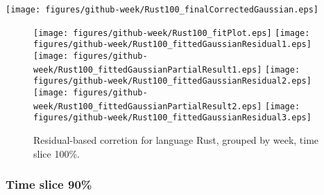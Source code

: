 \begin{center}
{\texttt{[image: figures/github-week/Rust100\_finalCorrectedGaussian.eps]}}
\end{center}

\FloatBarrier

\begin{figure}[t]
\centering
{}
{\texttt{[image: figures/github-week/Rust100\_fitPlot.eps]}}
{\texttt{[image: figures/github-week/Rust100\_fittedGaussianResidual1.eps]}}
{\texttt{[image: figures/github-week/Rust100\_fittedGaussianPartialResult1.eps]}}
{\texttt{[image: figures/github-week/Rust100\_fittedGaussianResidual2.eps]}}
{\texttt{[image: figures/github-week/Rust100\_fittedGaussianPartialResult2.eps]}}
{\texttt{[image: figures/github-week/Rust100\_fittedGaussianResidual3.eps]}}
\caption{Residual-based corretion for language Rust, grouped by week, time slice 100\%.}
\end{figure}


\FloatBarrier


\subsubsection{Time slice 90\%}

